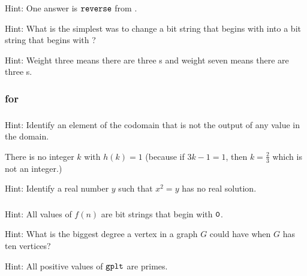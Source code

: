 \subsubsection*{ \answers}
\begin{apart}
    \item Hint: One answer is $\texttt{reverse}$ from .
    \item Hint: What is the simplest was to change a bit string that begins with  into a bit string that begins with ?
    \item Hint: Weight three means there are three s and weight seven means there are three s.
\end{apart}

\subsubsection{\answers for  \subonetooneonto}

\subsubsection*{ \answers}
\begin{apart}
    \item Hint: Identify an element of the codomain that is not the output of any value in the domain.
    \item There is no integer $k$ with $h(k)=1$ (because if $3k-1=1$, then $k= \frac{2}{3}$ which is not an integer.)
    \item Hint: Identify a real number $y$ such that $x^2=y$ has no real solution.
\end{apart}

\subsubsection*{ \answers}
\begin{apart}
    \item Hint: All values of $f(n)$ are bit strings that begin with $\texttt{0}$.
    \item Hint: What is the biggest degree a vertex in a graph $G$ could have when $G$ has ten vertices?
    \item Hint: All positive values of $\texttt{gplt}$ are primes.
\end{apart}

